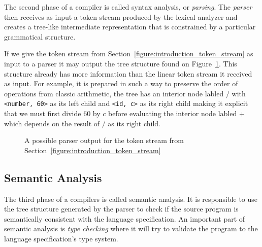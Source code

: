\documentclass[
  english,
  lmodern,
  oneside
]{ufsc-thesis-rn46-2019/ufsc-thesis-rn46-2019}
\begin{document}
The second phase of a compiler is called syntax analysis, or \textit{parsing}.
The \textit{parser} then receives as input a token stream produced by the lexical analyzer and creates a tree-like intermediate representation that is constrained by a particular grammatical structure.


If we give the token stream from Section~\ref{figure:introduction_token_stream} as input to a parser it may output the tree structure found on Figure~\ref{figure:introduction_ast}.
This structure already has more information than the linear token stream it received as input.
For example, it is prepared in such a way to preserve the order of operations from classic arithmetic, the tree has an interior node labled $/$ with \verb+<number, 60>+ as its left child and \verb+<id, c>+ as its right child making it explicit that we must first divide $60$ by $c$ before evaluating the interior node labled $+$ which depends on the result of $/$ as its right child.

\begin{figure}
\caption{A possible parser output for the token stream from Section~\ref{figure:introduction_token_stream}}\label{figure:introduction_ast}
\centering
{}
\end{figure}

\subsection{Semantic Analysis}

The third phase of a compilers is called semantic analysis.
It is responsible to use the tree structure generated by the parser to check if the source program is semantically consistent with the language specification.
An important part of semantic analysis is \textit{type checking} where it will try to validate the program to the language specification's type system.
\end{document}
